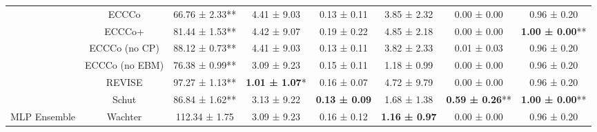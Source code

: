 \begin{table}
{\begin{tabular}[t]{cccccccc}
 & ECCCo & 66.76 ± 2.33** & 4.41 ± 9.03\hphantom{*}\hphantom{*} & 0.13 ± 0.11\hphantom{*}\hphantom{*} & 3.85 ± 2.32\hphantom{*}\hphantom{*} & 0.00 ± 0.00\hphantom{*}\hphantom{*} & 0.96 ± 0.20\hphantom{*}\hphantom{*}\\

 & ECCCo+ & 81.44 ± 1.53** & 4.42 ± 9.07\hphantom{*}\hphantom{*} & 0.19 ± 0.22\hphantom{*}\hphantom{*} & 4.85 ± 2.18\hphantom{*}\hphantom{*} & 0.00 ± 0.00\hphantom{*}\hphantom{*} & \textbf{1.00 ± 0.00}**\\

 & ECCCo (no CP) & 88.12 ± 0.73** & 4.41 ± 9.03\hphantom{*}\hphantom{*} & 0.13 ± 0.11\hphantom{*}\hphantom{*} & 3.82 ± 2.33\hphantom{*}\hphantom{*} & 0.01 ± 0.03\hphantom{*}\hphantom{*} & 0.96 ± 0.20\hphantom{*}\hphantom{*}\\

 & ECCCo (no EBM) & 76.38 ± 0.99** & 3.09 ± 9.23\hphantom{*}\hphantom{*} & 0.15 ± 0.11\hphantom{*}\hphantom{*} & 1.18 ± 0.99\hphantom{*}\hphantom{*} & 0.00 ± 0.00\hphantom{*}\hphantom{*} & 0.96 ± 0.20\hphantom{*}\hphantom{*}\\

 & REVISE & 97.27 ± 1.13** & \textbf{1.01 ± 1.07}*\hphantom{*} & 0.16 ± 0.07\hphantom{*}\hphantom{*} & 4.72 ± 9.79\hphantom{*}\hphantom{*} & 0.00 ± 0.00\hphantom{*}\hphantom{*} & 0.96 ± 0.20\hphantom{*}\hphantom{*}\\

 & Schut & 86.84 ± 1.62** & 3.13 ± 9.22\hphantom{*}\hphantom{*} & \textbf{0.13 ± 0.09}\hphantom{*}\hphantom{*} & 1.68 ± 1.38\hphantom{*}\hphantom{*} & \textbf{0.59 ± 0.26}** & \textbf{1.00 ± 0.00}**\\

\multirow[t]{-10}{*}{\centering\arraybackslash MLP Ensemble} & Wachter & 112.34 ± 1.75\hphantom{*}\hphantom{*} & 3.09 ± 9.23\hphantom{*}\hphantom{*} & 0.16 ± 0.12\hphantom{*}\hphantom{*} & \textbf{1.16 ± 0.97}\hphantom{*}\hphantom{*} & 0.00 ± 0.00\hphantom{*}\hphantom{*} & 0.96 ± 0.20\hphantom{*}\hphantom{*}\\
\bottomrule
\end{tabular}}
\end{table}
